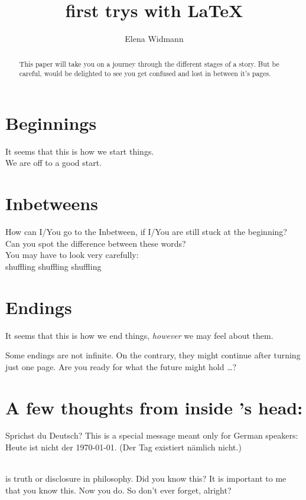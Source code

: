 \documentclass{article}
\author{Elena Widmann}
\title{first trys with \LaTeX}
\begin{document}
\maketitle
\tableofcontents
\setlength{\parindent}{0pt}\newpage

\begin{abstract}
This paper will take you on a journey through the different stages of a story. But be careful, \TheWriter{} would be delighted to see you get confused and lost in between it's pages.
\end{abstract}


\newpage
\section{Beginnings}
It seems that this is how we start things.\\
We are off to a good start.
\section{Inbetweens}
How can I\slash You go to the Inbetween, if I\slash You are still stuck at the beginning?\\
Can you spot the difference between these words? \\You may have to look very carefully:\\
shuffling shuf\mbox{}fling shuf\mbox{}f\mbox{}ling
\section{Endings}
It seems that this is how we end things, \emph{however} we may feel about them.

\newpage 
Some endings are not infinite. On the contrary, they might continue after turning just one page. Are you ready for what the future might hold \ldots ?
\newpage\section*{A few thoughts from inside \TheWriter's head:}

\begin{german}
Sprichst du Deutsch?
\textenglish{This is a special message meant only for German speakers:}
Heute ist nicht der \today. (Der Tag existiert nämlich nicht.)
\end{german}\\[1cm]

is truth or disclosure in philosophy. Did you know this? It is important to me that you know this. Now you do. So don't ever forget, alright?\\[1cm]
\end{document}
